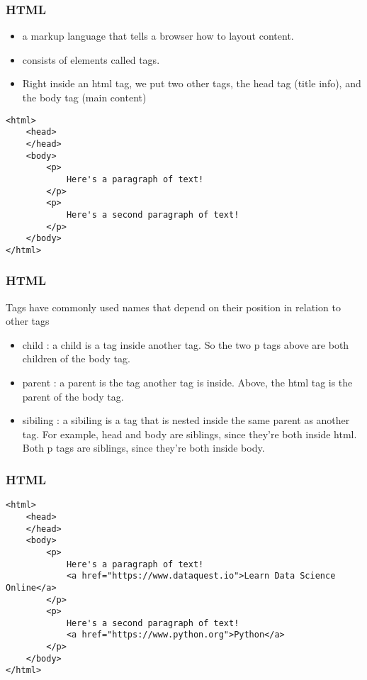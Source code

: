 \begin{frame}[fragile]\frametitle{HTML}

    \begin{itemize}
    \item  a markup language that tells a browser how to layout content.
    \item consists of elements called tags. 
    \item Right inside an html tag, we put two other tags, the head tag (title info), and the body tag (main content) 
    \end{itemize}
\begin{lstlisting}
<html>
    <head>
    </head>
    <body>
        <p>
            Here's a paragraph of text!
        </p>
        <p>
            Here's a second paragraph of text!
        </p>
    </body>
</html>
\end{lstlisting}
\end{frame}

\begin{frame}[fragile]\frametitle{HTML}
Tags have commonly used names that depend on their position in relation to other tags
    \begin{itemize}
    \item  
    child : a child is a tag inside another tag. So the two p tags above are both children of the body tag.
    \item    parent : a parent is the tag another tag is inside. Above, the html tag is the parent of the body tag.
    \item   sibiling : a sibiling is a tag that is nested inside the same parent as another tag. For example, head and body are siblings, since they're both inside html. Both p tags are siblings, since they're both inside body.

    \end{itemize}
\end{frame}

\begin{frame}[fragile]\frametitle{HTML}
\begin{lstlisting}
<html>
    <head>
    </head>
    <body>
        <p>
            Here's a paragraph of text!
            <a href="https://www.dataquest.io">Learn Data Science Online</a>
        </p>
        <p>
            Here's a second paragraph of text!
            <a href="https://www.python.org">Python</a>
        </p>
    </body>
</html>
\end{lstlisting}
\end{frame}

